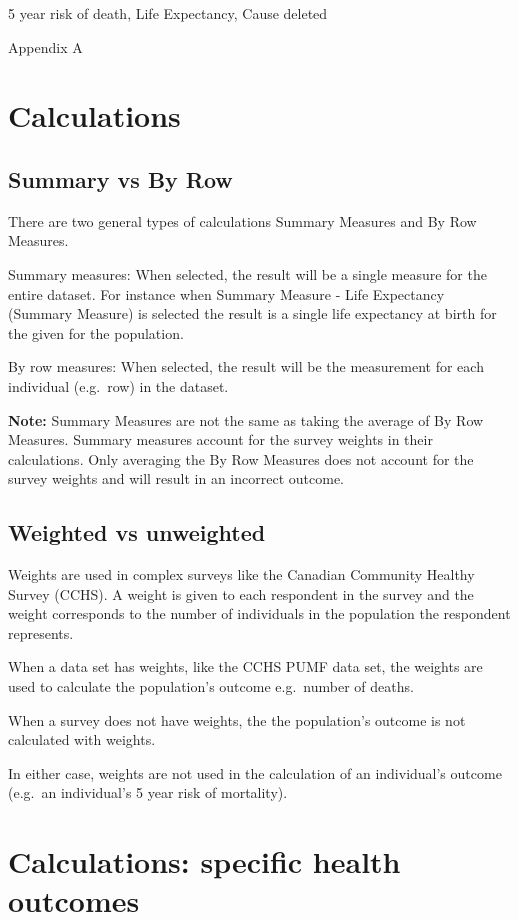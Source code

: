 \documentclass[]{book}
\begin{document}
5 year risk of death, Life Expectancy, Cause deleted

Appendix A

\section{Calculations}\label{calculations}

\subsection{Summary vs By Row}\label{summary-vs-by-row}

There are two general types of calculations Summary Measures and By Row
Measures.

Summary measures: When selected, the result will be a single measure for
the entire dataset. For instance when Summary Measure - Life Expectancy
(Summary Measure) is selected the result is a single life expectancy at
birth for the given for the population.

By row measures: When selected, the result will be the measurement for
each individual (e.g.~row) in the dataset.

\textbf{Note:} Summary Measures are not the same as taking the average
of By Row Measures. Summary measures account for the survey weights in
their calculations. Only averaging the By Row Measures does not account
for the survey weights and will result in an incorrect outcome.

\subsection{Weighted vs unweighted}\label{weighted-vs-unweighted}

Weights are used in complex surveys like the Canadian Community Healthy
Survey (CCHS). A weight is given to each respondent in the survey and
the weight corresponds to the number of individuals in the population
the respondent represents.

When a data set has weights, like the CCHS PUMF data set, the weights
are used to calculate the population's outcome e.g.~number of deaths.

When a survey does not have weights, the the population's outcome is not
calculated with weights.

In either case, weights are not used in the calculation of an
individual's outcome (e.g.~an individual's 5 year risk of mortality).

\section{Calculations: specific health
outcomes}\label{calculations-specific-health-outcomes}
\end{document}
